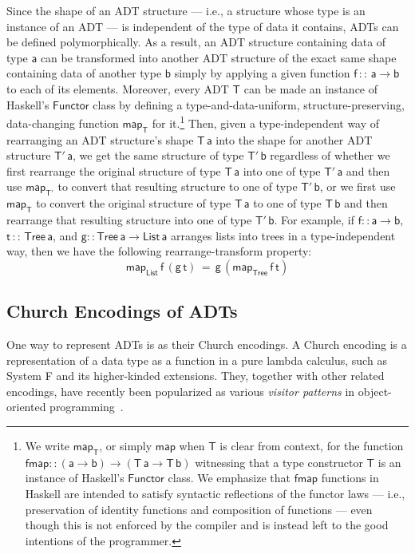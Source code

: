 \documentclass[submission,copyright,creativecommons]{eptcs}
\begin{document}
Since the shape of an ADT structure --- i.e., a structure whose type
is an instance of an ADT --- is independent of the type of data it
contains, ADTs can be defined polymorphically. As a result, an ADT
structure containing data of type $\mathsf{a}$ can be transformed into
another ADT structure of the exact same shape containing data of
another type $\mathsf{b}$ simply by applying a given function
$\mathsf{f \,::\,a \to b}$ to each of its elements. Moreover, every ADT
$\mathsf{T}$ can be made an instance of Haskell's $\mathsf{Functor}$
class by defining a type-and-data-uniform, structure-preserving,
data-changing function $\mathsf{map_T}$ for it.\footnote{We write
  $\mathsf{map_T}$, or simply $\mathsf{map}$ when $\mathsf{T}$ is
  clear from context, for the function $\mathsf{fmap :: (a \to b) \to
    (T\,a \to T\,b)}$ witnessing that a type constructor $\mathsf{T}$
  is an instance of Haskell's $\mathsf{Functor}$ class. We
  emphasize that $\mathsf{fmap}$ functions in Haskell are intended to
  satisfy syntactic reflections of the functor laws ---
  i.e., preservation of identity functions and composition of
  functions --- even though this is not enforced by the compiler and
  is instead left to the good intentions of the programmer.}
Then, given a type-independent way of rearranging an ADT
structure's shape $\mathsf{T\,a}$ into the shape for another ADT
structure $\mathsf{T'\,a}$, we get the same structure of type
$\mathsf{T'\,b}$ regardless of whether we first rearrange the original
structure of type $\mathsf{T\,a}$ into one of type $\mathsf{T'\,a}$
and then use $\mathsf{map_{T'}}$ to convert that resulting structure
to one of type $\mathsf{T'\,b}$, or we first use $\mathsf{map_T}$ to
convert the original structure of type $\mathsf{T\,a}$ to one of type
$\mathsf{T\,b}$ and then rearrange that resulting structure into one
of type $\mathsf{T'\,b}$. For example, if $\mathsf{f :: a \to b}$,
$\mathsf{t \,::\,Tree\,a}$, and $\mathsf{g :: Tree\,a\to List\,a}$
arranges lists into trees in a type-independent way, then we have the
following rearrange-transform property:
\[\mathsf{map_{List}\,f\,(g \, t) \,=\, g\,(map_{Tree}\,f\,t)}\]

\subsection{Church Encodings of ADTs}

One way to represent ADTs is as their Church encodings. A Church
encoding is a representation of a data type as a function in a pure
lambda calculus, such as System F and its higher-kinded
extensions. They, together with other related encodings, have recently
been popularized as various {\em visitor patterns} in object-oriented
programming~\cite{gon21,owg08}.
\end{document}
